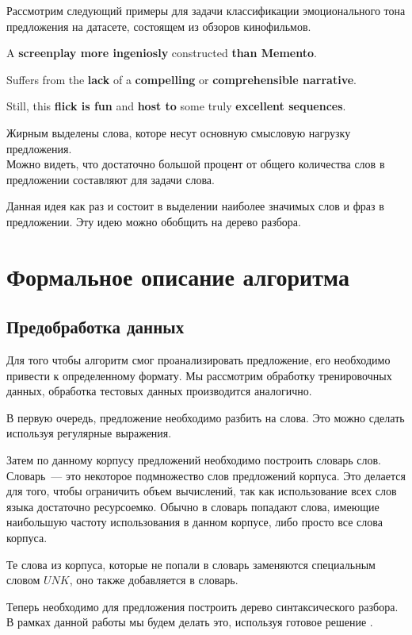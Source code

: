 Рассмотрим следующий примеры для задачи классификации эмоционального тона предложения на датасете, состоящем из
обзоров кинофильмов.

{\selectfont A \textbf{screenplay more ingeniosly} constructed \textbf{than Memento}.}

{\selectfont Suffers from the \textbf{lack} of a \textbf{compelling} or \textbf{comprehensible narrative}.}

{\selectfont Still, this \textbf{flick is fun} and \textbf{host to} some truly \textbf{excellent sequences}.}

\noindent Жирным выделены слова, которе несут основную смысловую нагрузку предложения.\\
Можно видеть, что достаточно большой процент от общего количества слов в предложении составляют 
 для задачи слова.

Данная идея как раз и состоит в выделении наиболее значимых слов и фраз в предложении.
Эту идею можно обобщить на дерево разбора.

\section{Формальное описание алгоритма} \label{formal}

\subsection{Предобработка данных} \label{prework}
Для того чтобы алгоритм смог проанализировать предложение, 
его необходимо привести к определенному формату. Мы рассмотрим обработку
тренировочных данных, обработка тестовых данных производится аналогично.

В первую очередь, предложение необходимо разбить на слова. 
Это можно сделать используя регулярные выражения. 

Затем по данному корпусу предложений необходимо построить словарь слов.
Словарь~--- это некоторое подмножество слов предложений корпуса.
Это делается для того, чтобы ограничить объем вычислений, так как использование всех
слов языка достаточно ресурсоемко. Обычно в словарь попадают слова, 
имеющие наибольшую частоту использования в данном корпусе, 
либо просто все слова корпуса.

Те слова из корпуса, которые не попали в словарь заменяются специальным словом $UNK$, 
оно также добавляется в словарь.

Теперь необходимо для предложения построить дерево синтаксического разбора.
В рамках данной работы мы будем делать это, используя готовое решение \cite{lex-parser}.

